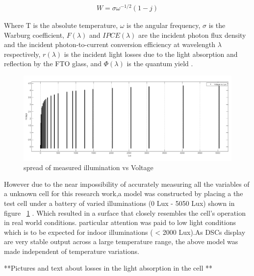 {   \begin{equation}
     \begin{aligned}
     W = \sigma{\omega^{-1/2}}(1-\textit{j})
     \end{aligned}
    \end{equation}
    
Where T is the absolute temperature, $\omega$ is the angular frequency, $\sigma$ is the Warburg coefficient, $F(\lambda)$ and  $IPCE(\lambda)$ are the incident photon flux density and the incident photon-to-current conversion efficiency at wavelength $\lambda$ respectively, $r(\lambda)$ is the incident light losses due to the light absorption and reflection by the FTO glass, and $\Phi(\lambda)$ is the quantum yield \cite{yong2008modeling}.\newline

 \begin{figure}[H]
  \begin{center}
	\includegraphics[width=\linewidth]{images/Voltagevlux}
	\caption{spread of measured illumination vs Voltage  }
	\label{fig:Voltagevlux}
  \end{center}
 \end{figure}
 
However due to the near impossibility of accurately measuring all the variables of a unknown cell for this research work,a model was constructed by placing a the test cell under a battery of varied illuminations (0 Lux - 5050 Lux) shown in figure ~\ref{fig:Voltagevlux} . Which resulted in a surface that closely resembles the cell's operation in real world conditions. particular attention was paid to low light conditions which is to be expected for indoor illuminations ( < 2000 Lux).As \ac{DSCs} display are very stable output across a large temperature range, the above model was made independent of temperature variations.   




**Pictures and text about losses in the light absorption in the cell **

}
